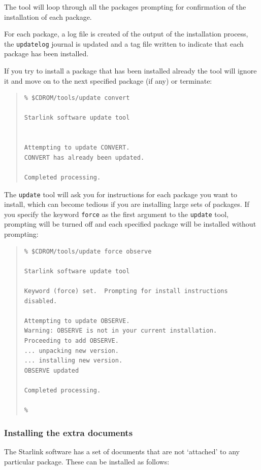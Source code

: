 \documentclass[twoside,11pt]{article}
\renewcommand{\_}{\texttt{\symbol{95}}}
\begin{document}
The tool will loop through all the packages prompting for confirmation of
the installation of each package.  

For each package, a log file is created of the output of the installation
process, the \texttt{update\_log} journal is updated and a tag file
written to indicate that each package has been installed.

If you try to install a package that has been installed already the
tool will ignore it and move on to the next specified package (if any) or
terminate:

\begin{quote}
\begin{verbatim}
% $CDROM/tools/update convert
 
Starlink software update tool
 
 
Attempting to update CONVERT.
CONVERT has already been updated.
 
Completed processing.
\end{verbatim}
\end{quote}

The \texttt{update} tool will ask you for instructions for each package
you want to install, which can become tedious if you are installing large
sets of packages.  If you specify the keyword \texttt{force} as the first
argument to the \texttt{update} tool, prompting will be turned off and
each specified package will be installed without prompting:

\begin{quote}
\begin{verbatim}
% $CDROM/tools/update force observe
 
Starlink software update tool
 
Keyword (force) set.  Prompting for install instructions disabled.
 
Attempting to update OBSERVE.
Warning: OBSERVE is not in your current installation.
Proceeding to add OBSERVE.
... unpacking new version.
... installing new version.
OBSERVE updated
 
Completed processing.

%
\end{verbatim}
\end{quote}

\subsubsection{Installing the extra documents}

The Starlink software has a set of documents that are not `attached' to
any particular package.  These can be installed as follows:
\end{document}

